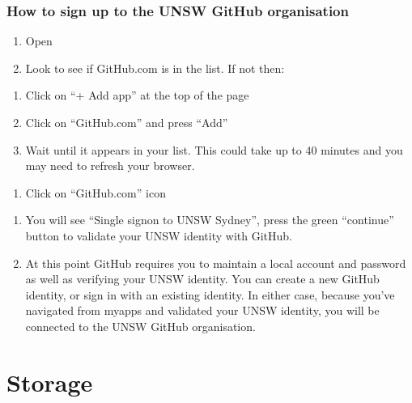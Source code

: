 \documentclass[letterpaper,10pt,english]{sphinxmanual}
\begin{document}
\subsection{How to sign up to the UNSW GitHub organisation}
\label{\detokenize{using_katana/github:how-to-sign-up-to-the-unsw-github-organisation}}\begin{enumerate}
%
\item {} 
Open 

\item {} 
Look to see if GitHub.com is in the list. If not then:

\end{enumerate}
\begin{enumerate}
%
\item {} 
Click on “+ Add app” at the top of the page

\item {} 
Click on “GitHub.com” and press “Add”

\item {} 
Wait until it appears in your list. This could take up to 40 minutes and you may need to refresh your browser.

\end{enumerate}
\begin{enumerate}
%
\setcounter{enumi}{2}
\item {} 
Click on “GitHub.com” icon

\end{enumerate}
\begin{enumerate}
%
\item {} 
You will see “Single sign\sphinxhyphen{}on to UNSW Sydney”, press the green “continue” button to validate your UNSW identity with GitHub.

\item {} 
At this point GitHub requires you to maintain a local account and password as well as verifying your UNSW identity.  You can create a new GitHub identity, or sign in with an existing identity.  In either case, because you’ve navigated from myapps and validated your UNSW identity, you will be connected to the UNSW GitHub organisation.

\end{enumerate}


\chapter{Storage}
\label{\detokenize{storage/index:storage}}\label{\detokenize{storage/index:id1}}\label{\detokenize{storage/index::doc}}
\end{document}
